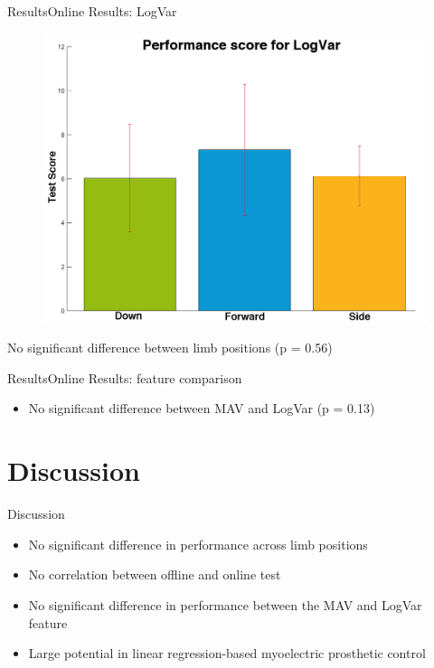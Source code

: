 \documentclass[10pt]{beamer}
\begin{document}
\begin{frame}{Results}{Online Results: LogVar}
\begin{figure}
	\includegraphics[scale=0.27]{figures/gotItLogVar.png}
\end{figure}
No significant difference between limb positions (p = 0.56)
\end{frame}

\begin{frame}{Results}{Online Results: feature comparison}
\begin{itemize}
	\item No significant difference between MAV and LogVar (p = 0.13)
\end{itemize}
\end{frame}



\section{Discussion}
\begin{frame}{Discussion}
\begin{itemize}
	\item<1-> No significant difference in performance across limb positions
	\item<2-> No correlation between offline and online test
	\item<3-> No significant difference in performance between the MAV and LogVar feature
	\item<4-> Large potential in linear regression-based myoelectric prosthetic control
\end{itemize}

\end{frame}
\end{document}
